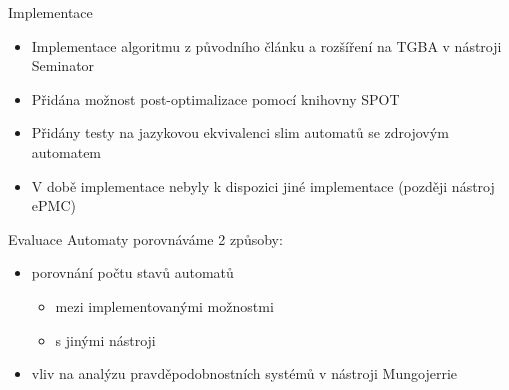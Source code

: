 \documentclass[
]{beamer}
\begin{document}
	\begin{frame}{Implementace}
		\begin{itemize}
			\pause
			\item Implementace algoritmu z původního článku a rozšíření na TGBA v nástroji Seminator
			\pause
			\item Přidána možnost post-optimalizace pomocí knihovny SPOT
			\pause
				
			\pause
			\item Přidány testy na jazykovou ekvivalenci slim automatů se zdrojovým automatem
			\pause
			\item V době implementace nebyly k dispozici jiné implementace (později nástroj ePMC)
			
		\end{itemize}
	\end{frame}

	\begin{frame}{Evaluace}
		Automaty porovnáváme 2 způsoby:
		\pause
		\begin{itemize}
			\item porovnání počtu stavů automatů
			\begin{itemize}
				\item mezi implementovanými možnostmi
				\item s jinými nástroji
			\end{itemize}
			\pause
			\item vliv na analýzu pravděpodobnostních systémů v nástroji Mungojerrie
		\end{itemize}
	\end{frame}

	
\end{document}
